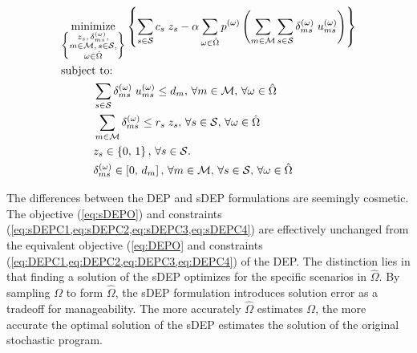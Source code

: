 \documentclass[12pt,dvipsnames]{report}
\begin{document}
\begin{tcolorbox}[floatplacement = !ht, float, title = Sampled Deterministic Equivalent Program (sDEP) of \Cref{eq:SOPS1O,eq:SOPS1C1,eq:SOPS2O,eq:SOPS2C1,eq:SOPS2C2,eq:SOPS2C3,eq:SOPS2C4}]
\begin{align}
& \underset{\left\{ \substack{
	z_s,\, \delta_{ms}^{\left( \omega \right)},\\
	m \in \mathcal{M},\, s \in \mathcal{S},\\
	\omega \in \hat{\Omega}} \right\}} {\text{minimize}}
\left\{ \sum_{s \in \mathcal{S}} c_s \; z_s - \alpha \sum_{\omega \in \hat{\Omega}} p^{\left( \omega \right)} \left( \sum_{m \in \mathcal{M}} \sum_{s \in \mathcal{S}} \delta_{ms}^{\left( \omega \right)} \; u_{ms}^{\left( \omega \right)} \right) \right\} \label{eq:sDEPO}\\
& \text{subject to:}  \nonumber \\
& \hspace{0.4in} \sum_{s \in \mathcal{S}} \delta_{ms}^{\left( \omega \right)} \; u_{ms}^{\left( \omega \right)} \leq d_m,\, \forall m \in \mathcal{M},\, \forall \omega \in \hat{\Omega} \label{eq:sDEPC1}\\
& \hspace{0.4in} \sum_{m \in \mathcal{M}} \delta_{ms}^{\left( \omega \right)} \leq r_s \; z_s,\, \forall s \in \mathcal{S},\, \forall \omega \in \hat{\Omega} \label{eq:sDEPC2}\\
& \hspace{0.4in} z_s \in \left\{ 0,\, 1 \right\},\, \forall s \in \mathcal{S}. \label{eq:sDEPC3}\\
& \hspace{0.4in} \delta_{ms}^{\left( \omega \right)} \in \left[ 0,\, d_m \right],\, \forall m \in \mathcal{M},\, \forall s \in \mathcal{S},\, \forall \omega \in \hat{\Omega} \label{eq:sDEPC4}
\end{align}
\end{tcolorbox}

The differences between the DEP and sDEP formulations are seemingly cosmetic.  The objective (\cref{eq:sDEPO}) and constraints (\cref{eq:sDEPC1,eq:sDEPC2,eq:sDEPC3,eq:sDEPC4}) are effectively unchanged from the equivalent objective (\cref{eq:DEPO} and constraints (\cref{eq:DEPC1,eq:DEPC2,eq:DEPC3,eq:DEPC4}) of the DEP.  The distinction lies in that finding a solution of the sDEP optimizes for the specific scenarios in $\hat{\Omega}$.  By sampling $\Omega$ to form $\hat{\Omega}$, the sDEP formulation introduces solution error as a tradeoff for manageability.  The more accurately $\hat{\Omega}$ estimates $\Omega$, the more accurate the optimal solution of the sDEP estimates the solution of the original stochastic program.
\end{document}
